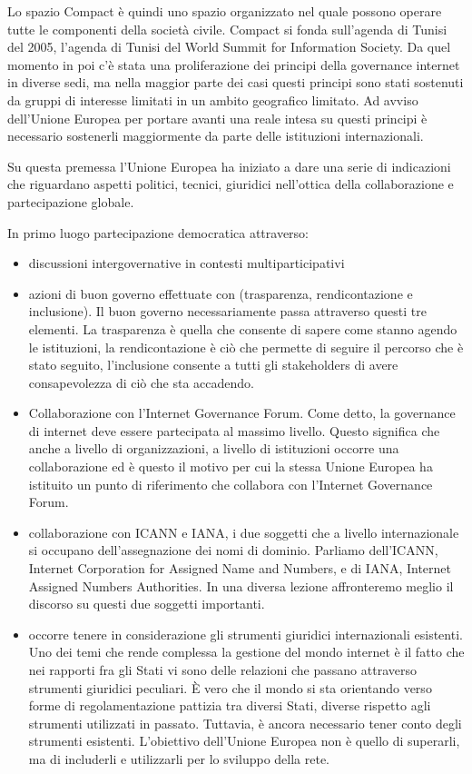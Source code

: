 \par
Lo spazio Compact è quindi uno spazio organizzato nel quale possono operare tutte le componenti della società civile. Compact si fonda sull'agenda di Tunisi del 2005, l'agenda di Tunisi del World Summit for Information Society. Da quel momento in poi c'è stata una proliferazione dei principi della governance internet in diverse sedi, ma nella maggior parte dei casi questi principi sono stati sostenuti da gruppi di interesse limitati in un ambito geografico limitato. Ad avviso dell'Unione Europea per portare avanti una reale intesa su questi principi è necessario sostenerli maggiormente da parte delle istituzioni internazionali. \par
Su questa premessa l'Unione Europea ha iniziato a dare una serie di indicazioni che riguardano aspetti politici, tecnici, giuridici nell'ottica della collaborazione e partecipazione globale. \par
In primo luogo partecipazione democratica attraverso:
\begin{itemize}
    \item discussioni intergovernative in contesti multiparticipativi
    \item  azioni di buon governo effettuate con (trasparenza, rendicontazione e inclusione). Il buon governo necessariamente passa attraverso questi tre elementi. La trasparenza è quella che consente di sapere come stanno agendo le istituzioni, la rendicontazione è ciò che permette di seguire il percorso che è stato seguito, l'inclusione consente a tutti gli stakeholders di avere consapevolezza di ciò che sta accadendo.
    \item Collaborazione con l'Internet Governance Forum. Come detto, la governance di internet deve essere partecipata al massimo livello. Questo significa che anche a livello di organizzazioni, a livello di istituzioni occorre una collaborazione ed è questo il motivo per cui la stessa Unione Europea ha istituito un punto di riferimento che collabora con l'Internet Governance Forum.
    \item collaborazione con ICANN e IANA, i due soggetti che a livello internazionale si occupano dell'assegnazione dei nomi di dominio. Parliamo dell'ICANN, Internet Corporation for Assigned Name and Numbers, e di IANA, Internet Assigned Numbers Authorities. In una diversa lezione affronteremo meglio il discorso su questi due soggetti importanti.
    \item occorre tenere in considerazione gli strumenti giuridici internazionali esistenti. Uno dei temi che rende complessa la gestione del mondo internet è il fatto che nei rapporti fra gli Stati vi sono delle relazioni che passano attraverso strumenti giuridici peculiari. È vero che il mondo si sta orientando verso forme di regolamentazione pattizia tra diversi Stati, diverse rispetto agli strumenti utilizzati in passato. Tuttavia, è ancora necessario tener conto degli strumenti esistenti. L’obiettivo dell’Unione Europea non è quello di superarli, ma di includerli e utilizzarli per lo sviluppo della rete.
\end{itemize}
